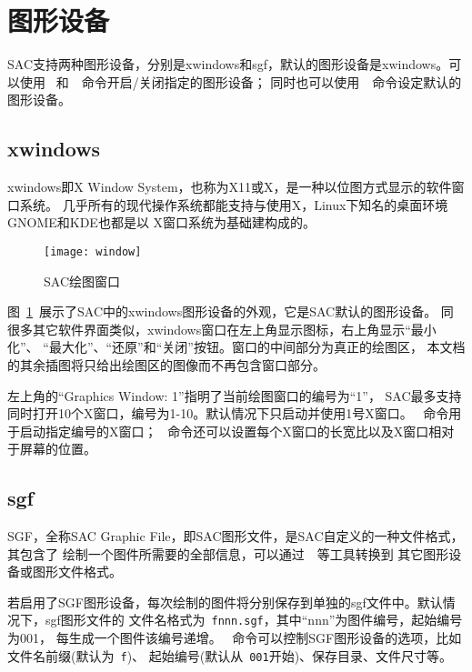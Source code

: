 \section{图形设备}
SAC支持两种图形设备，分别是xwindows和sgf，默认的图形设备是xwindows。可以使用
~和~~命令开启/关闭指定的图形设备；
同时也可以使用~~命令设定默认的图形设备。

\subsection{xwindows}
xwindows即X Window System，也称为X11或X，是一种以位图方式显示的软件窗口系统。
几乎所有的现代操作系统都能支持与使用X，Linux下知名的桌面环境GNOME和KDE也都是以
X窗口系统为基础建构成的。

\begin{figure}[H]
\centering
\texttt{[image: window]}
\caption{SAC绘图窗口}
\label{fig:plot}
\end{figure}

图~\ref{fig:plot}~展示了SAC中的xwindows图形设备的外观，它是SAC默认的图形设备。
同很多其它软件界面类似，xwindows窗口在左上角显示图标，右上角显示``最小化''、
``最大化''、``还原''和``关闭''按钮。窗口的中间部分为真正的绘图区，
本文档的其余插图将只给出绘图区的图像而不再包含窗口部分。

左上角的``Graphics Window: 1''指明了当前绘图窗口的编号为``1''，
SAC最多支持同时打开10个X窗口，编号为1-10。默认情况下只启动并使用1号X窗口。
~命令用于启动指定编号的X窗口；
~命令还可以设置每个X窗口的长宽比以及X窗口相对于屏幕的位置。

\subsection{sgf}
SGF，全称SAC Graphic File，即SAC图形文件，是SAC自定义的一种文件格式，其包含了
绘制一个图件所需要的全部信息，可以通过~~等工具转换到
其它图形设备或图形文件格式。

若启用了SGF图形设备，每次绘制的图件将分别保存到单独的sgf文件中。默认情况下，sgf图形文件的
文件名格式为~\verb+fnnn.sgf+，其中``nnn''为图件编号，起始编号为001，
每生成一个图件该编号递增。
~命令可以控制SGF图形设备的选项，比如文件名前缀(默认为~\verb+f+)、
起始编号(默认从~\verb+001+开始)、保存目录、文件尺寸等。
